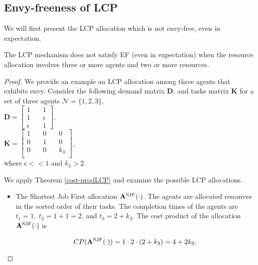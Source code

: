 \documentclass[letterpaper]{article} %
\theoremstyle{definition}
\newenvironment{customlemma}[1]
  {\renewcommand\theinnercustomlemma{#1}\innercustomlemma}
  {\endinnercustomlemma}
\begin{document}
\subsection{Envy-freeness of LCP}

We will first present the LCP allocation which is not envy-free, even in expectation.

\begin{customlemma}{5}
The LCP mechanism does not satisfy EF (even in expectation) when the resource allocation involves three or more agents and two or more resources. 
\end{customlemma}

\begin{proof}
We provide an example an LCP allocation among three agents that exhibits envy. Consider the following demand matrix $\mathbf{D}$, and tasks matrix $\mathbf{K}$ for a set of three agents $\mathcal{N} = \{1, 2, 3\}$, \\

\noindent $\mathbf{D} = \begin{bmatrix} 1 \quad & 1 \\
1 \quad & \epsilon \\
\epsilon \quad & 1\end{bmatrix} ,\quad$\\[2 pt]

\noindent $\mathbf{K} = \begin{bmatrix} 1 \quad & 0 \quad & 0 \\
0 \quad & 1 \quad & 0 \\
0 \quad & 0 \quad & k_{3} \\\end{bmatrix}, \quad$\\[2 pt]

\noindent where $\epsilon << 1$ and $k_{3} > 2$.

\noindent We apply Theorem \ref{cost-prodLCP} and examine the possible LCP allocations.

\begin{itemize}
    \item The Shortest Job First allocation $\mathbf{A}^{\textnormal{SJF}}(\cdot)$. The agents are allocated resources in the sorted order of their tasks. The completion times of the agents are $t_{1} = 1,\; t_{2} = 1 + 1  = 2$, and $t_{3} = 2 + k_{3}$. The cost product of the allocation $\mathbf{A}^{\textnormal{SJF}}(\cdot)$ is
    \begin{linenomath}
    \begin{equation*}
    CP(\mathbf{A}^{\textnormal{SJF}}(\cdot)) = 1 \cdot 2 \cdot (2 + k_{3}) = 4 + 2 k_{3}.
    \end{equation*}
    \end{linenomath}
    

\end{itemize}
\end{proof}
\end{document}
